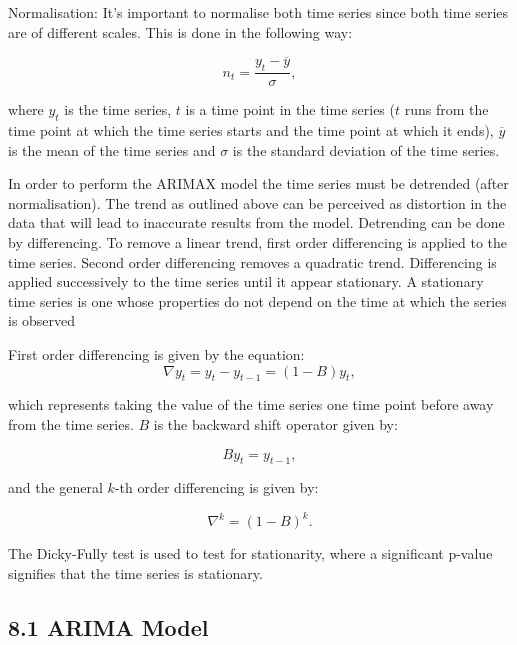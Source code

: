 \documentclass[
]{article}
\begin{document}
Normalisation: It's important to normalise both time series since both
time series are of different scales. This is done in the following way:

\begin{equation}
n_{t} = \frac{y_t - \overline{y}}{\sigma},
\end{equation}

where \(y_t\) is the time series, \(t\) is a time point in the time
series (\(t\) runs from the time point at which the time series starts
and the time point at which it ends), \(\overline{y}\) is the mean of
the time series and \(\sigma\) is the standard deviation of the time
series.

In order to perform the ARIMAX model the time series must be detrended
(after normalisation). The trend as outlined above can be perceived as
distortion in the data that will lead to inaccurate results from the
model. Detrending can be done by differencing. To remove a linear trend,
first order differencing is applied to the time series. Second order
differencing removes a quadratic trend. Differencing is applied
successively to the time series until it appear stationary. A stationary
time series is one whose properties do not depend on the time at which
the series is observed

First order differencing is given by the equation: \begin{equation}
\nabla y_t = y_{t} - y_{t-1} = (1 -B)y_t,
\end{equation}

which represents taking the value of the time series one time point
before away from the time series. \(B\) is the backward shift operator
given by:

\begin{equation}
By_t = y_{t-1},
\end{equation}

and the general \(k\)-th order differencing is given by:

\begin{equation}
\nabla^k = (1-B)^k.
\end{equation}

The Dicky-Fully test is used to test for stationarity, where a
significant p-value signifies that the time series is stationary.

\hypertarget{arima-model}{%
\subsection{8.1 ARIMA Model}\label{arima-model}}
\end{document}
